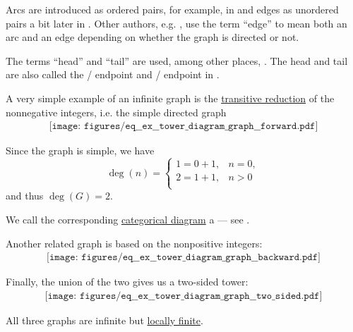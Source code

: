 \begin{remark}\label{rem:graph_endpoint_etymology}
  Arcs are introduced as ordered pairs, for example, in \cite[ch. 1, sec. 1.1]{GondranMinoux1984Graphs} and edges as unordered pairs a bit later in \cite[ch. 1, sec. 1.3]{GondranMinoux1984Graphs}. Other authors, e.g. \cite[sec. 5.2]{Erickson2019}, use the term \enquote{edge} to mean both an arc and an edge depending on whether the graph is directed or not.

  The terms \enquote{head} and \enquote{tail} are used, among other places, \cite[sec. 5.2]{Erickson2019}. The head and tail are also called the / endpoint and / endpoint in \cite[ch. 1, sec. 1.1]{GondranMinoux1984Graphs}.
\end{remark}

\begin{example}\label{ex:tower_diagram_graph}
  A very simple example of an infinite graph is the \hyperref[def:relation_closures/transitive]{transitive reduction} of the nonnegative integers, i.e. the simple directed graph
  \begin{equation}\label{eq:ex:tower_diagram_graph/forward}
    \begin{aligned}
      \texttt{[image: figures/eq\_\_ex\_\_tower\_diagram\_graph\_\_forward.pdf]}
    \end{aligned}
  \end{equation}

  Since the graph is simple, we have
  \begin{equation*}
    \deg(n) = \begin{cases}
      1 = 0 + 1, &n = 0, \\
      2 = 1 + 1, &n > 0 \\
    \end{cases}
  \end{equation*}
  and thus \( \deg(G) = 2 \).

  We call the corresponding \hyperref[def:categorical_diagram]{categorical diagram} a  --- see .

  Another related graph is based on the nonpositive integers:
  \begin{equation}\label{eq:ex:tower_diagram_graph/backward}
    \begin{aligned}
      \texttt{[image: figures/eq\_\_ex\_\_tower\_diagram\_graph\_\_backward.pdf]}
    \end{aligned}
  \end{equation}

  Finally, the union of the two gives us a two-sided tower:
  \begin{equation}\label{eq:ex:tower_diagram_graph/two_sided}
    \begin{aligned}
      \texttt{[image: figures/eq\_\_ex\_\_tower\_diagram\_graph\_\_two\_sided.pdf]}
    \end{aligned}
  \end{equation}

  All three graphs are infinite but \hyperref[def:graph/degree]{locally finite}.
\end{example}

